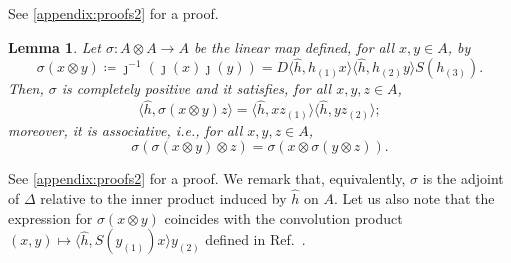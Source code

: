 \documentclass[a4paper,10pt]{amsart}
\newcommand{\eval}[2]{\langle #1 , #2\rangle}
\newtheorem{lemma}[theorem]{Lemma}
\theoremstyle{definition}
\begin{document}
\noindent%
See \cref{appendix:proofs2} for a proof.

\begin{lemma}
\label{lemma:sigma}
    Let $\sigma: A\otimes A \to A$ be the linear map defined, for all $x,y\in A$, by
	\begin{equation}\label{eq:def_sigma}
		\sigma(x\otimes y)
        \coloneqq 
        \jmath^{-1} (\jmath(x) \jmath(y))
        =
        D \eval{\hat{h}}{h_{(1)}x} \eval{\hat{h}}{h_{(2)}y} S(h_{(3)}).
	\end{equation}
    Then, $\sigma$ is completely positive and it satisfies,
	for all $x,y,z\in A$,
	\begin{equation}
    \label{eq:prophsigma}
		\eval{\hat{h}}{\sigma(x\otimes y)z}
		=
		\eval{\hat{h}}{x z_{(1)}} \eval{\hat{h}}{y z_{(2)}};
	\end{equation}
    moreover, it is associative, i.e., for all $x,y,z\in A$,
    \[
        \sigma(\sigma(x\otimes y)\otimes z)
        =
        \sigma(x \otimes \sigma(y\otimes z)).
    \]
\end{lemma}

\noindent%
See \cref{appendix:proofs2} for a proof. We remark that, equivalently, $\sigma$ is the adjoint of $\Delta$ relative to the inner product induced by $\hat{h}$ on $A$. Let us also note that the expression for $\sigma(x\otimes y)$ coincides with the convolution product $(x,y)\mapsto \eval{\hat{h}}{S(y_{(1)}) x} y_{(2)}$ defined in Ref.~\cite{vandaele_fourier_2007}.
\end{document}
